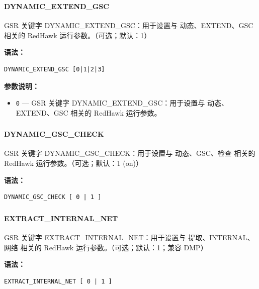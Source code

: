 \subsubsection{}
\paragraph*{DYNAMIC_EXTEND_GSC}

GSR 关键字 DYNAMIC_EXTEND_GSC：用于设置与 动态、EXTEND、GSC 相关的 RedHawk 运行参数。（可选；默认：1）

\textbf{语法：}
\begin{lstlisting}
DYNAMIC_EXTEND_GSC [0|1|2|3]
\end{lstlisting}

\textbf{参数说明：}
\begin{itemize}
\item \texttt{0} — GSR 关键字 DYNAMIC\_EXTEND\_GSC：用于设置与 动态、EXTEND、GSC 相关的 RedHawk 运行参数。
\end{itemize}

\subsubsection{}
\paragraph*{DYNAMIC_GSC_CHECK}

GSR 关键字 DYNAMIC_GSC_CHECK：用于设置与 动态、GSC、检查 相关的 RedHawk 运行参数。（可选；默认：1 (on)）

\textbf{语法：}
\begin{lstlisting}
DYNAMIC_GSC_CHECK [ 0 | 1 ]
\end{lstlisting}

\subsubsection{}
\paragraph*{EXTRACT_INTERNAL_NET}

GSR 关键字 EXTRACT_INTERNAL_NET：用于设置与 提取、INTERNAL、网络 相关的 RedHawk 运行参数。（可选；默认：1；兼容 DMP）

\textbf{语法：}
\begin{lstlisting}
EXTRACT_INTERNAL_NET [ 0 | 1 ]
\end{lstlisting}

